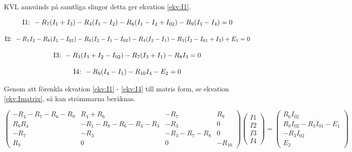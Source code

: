 \documentclass[a4paper,12pt]{article}
\begin{document}
KVL annvänds på samtliga slingor detta ger ekvation \ref{ekv:I1}.

\begin{equation}
\text{I1: }-R_7(I_1+I_3)-R_4(I_1-I_2)-R_6(I_1-I_2+I_{02})-R_9(I_1-I_4)=0 \\
\label{ekv:I1}
\end{equation}

\begin{equation}
\text{I2: }-R_1I_2-R_8(I_2-I_{02})-R_6(I_2-I_1-I_{02})-R_4(I_2-I_1)-R_3(I_2-I_{01}+I_3)+E_1=0 \\
\label{ekv:I2}
\end{equation}

\begin{equation}
\text{I3: }-R_3(I_3+I_2-I_{02})-R_7(I_3+I_1)-R_8I_3=0 \\
\label{ekv:I3}
\end{equation}

\begin{equation}
\text{I4: }-R_9(I_4-I_1)-R_{10}I_4-E_2=0 \\
\label{ekv:I4}
\end{equation}

Genom att förenkla ekvation \ref{ekv:I1} - \ref{ekv:I4} till matris form, se ekvation \ref{ekv:Imatrix}, så kan strömmarna beräknas.

\begin{equation}
\begin{pmatrix}
  -R_4-R_7-R_6-R_9 & R_4+R_6 & -R_7 & R_9\\
   R_6 R_4 & -R_1-R_8-R_6-R_4-R_3 & -R_3 & 0 \\
  -R_7 & -R_3 & -R_3-R_7-R_8 & 0 \\
   R_9 & 0 & 0 & -R_{10}
 \end{pmatrix}
 \begin{pmatrix}
    I1 \\
    I2 \\
    I3 \\
    I4
  \end{pmatrix}
 =
 \begin{pmatrix}
    R_6I_{02} \\
    R_8I_{02}-R_3I_{01}-E_1 \\
    -R_3I_{02} \\
    E_2
  \end{pmatrix}
\label{ekv:Imatrix}
\end{equation}
\end{document}
